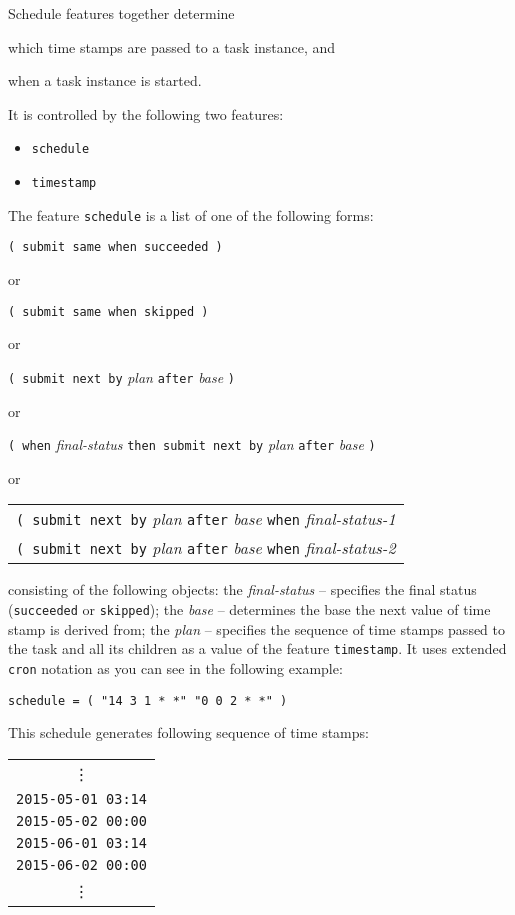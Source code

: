 \documentclass[a4paper,12pt,english,oneside]{book}
\begin{document}
Schedule features together determine%
\begin{inparaenum}[(i)]
    \item which time stamps are passed to a task instance, and
    \item when a task instance is started.
\end{inparaenum}
It is controlled by the following two features:
\begin{itemize}
    \item \verb|schedule|
    \item \verb|timestamp|
\end{itemize}
The feature \verb|schedule| is a list of one of the following forms:
\begin{center}
    \verb|( submit same when succeeded )|
\end{center}
or
\begin{center}
    \verb|( submit same when skipped )|
\end{center}
or
\begin{center}
    \verb|( submit next by| \emph{plan} \verb|after| \emph{base} \verb|)|
\end{center}
or
\begin{center}
    \verb|( when| \emph{final-status} \verb|then submit next by| \emph{plan} \verb|after| \emph{base} \verb|)|
\end{center}
or
\begin{center}
    \begin{tabular}{l}
        \verb|( submit next by| \emph{plan} \verb|after| \emph{base} \verb|when| \emph{final-status-1}\\
        \verb|( submit next by| \emph{plan} \verb|after| \emph{base} \verb|when| \emph{final-status-2}
    \end{tabular}
\end{center}
consisting of the following objects: the \emph{final-status} -- specifies the final status (\verb|succeeded| or \verb|skipped|); the \emph{base} -- determines the base the next value of time stamp is derived from; the \emph{plan} -- specifies the sequence of time stamps passed to the task and all its children as a value of the feature \verb|timestamp|. It uses extended \verb|cron| notation as you can see in the following example:
\begin{verbatim}
schedule = ( "14 3 1 * *" "0 0 2 * *" )
\end{verbatim}
This schedule generates following sequence of time stamps:
\begin{flushleft}
    \begin{tabular}{c}
        \vdots \\
        \texttt{2015-05-01 03:14} \\
        \texttt{2015-05-02 00:00} \\
        \texttt{2015-06-01 03:14} \\
        \texttt{2015-06-02 00:00} \\
        \vdots
    \end{tabular}
\end{flushleft}
\end{document}
